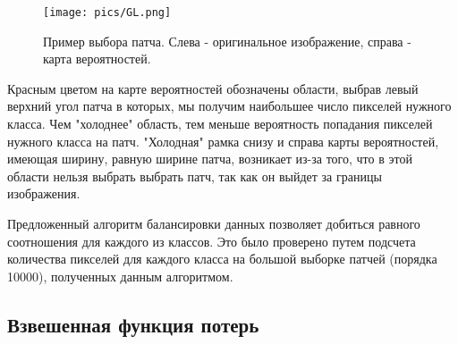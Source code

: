 \newline
\begin{figure}[H]
    \centering
    \texttt{[image: pics/GL.png]}
    \caption{Пример выбора патча. Слева - оригинальное изображение, справа - карта вероятностей.}
    \label{fig:algo}
\end{figure}
\par Красным цветом на карте вероятностей обозначены области, выбрав левый верхний угол патча в которых, мы получим наибольшее число пикселей нужного класса. Чем "холоднее" область, тем меньше вероятность попадания пикселей нужного класса на патч. "Холодная" рамка снизу и справа карты вероятностей, имеющая ширину, равную ширине патча, возникает из-за того, что в этой области нельзя выбрать выбрать патч, так как он выйдет за границы изображения.
\par Предложенный алгоритм балансировки данных позволяет добиться равного соотношения для каждого из классов. Это было проверено путем подсчета количества пикселей для каждого класса на большой выборке патчей (порядка 10000), полученных данным алгоритмом.

\subsection{Взвешенная функция потерь}


\newpage


